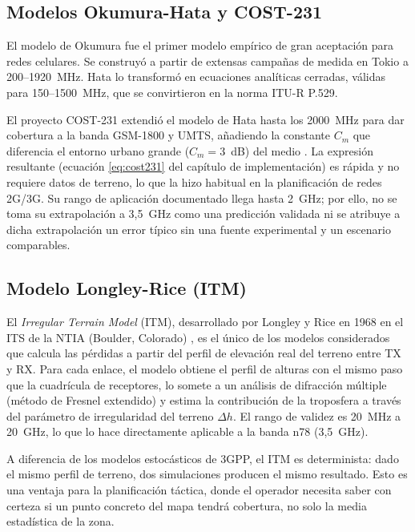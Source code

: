\subsection{Modelos Okumura-Hata y COST-231}
\label{subsec:hata}

El modelo de Okumura \cite{okumura1968field} fue el primer modelo empírico de gran
aceptación para redes celulares. Se construyó a partir de extensas campañas de medida en
Tokio a 200--1920~MHz. Hata \cite{hata1980empirical} lo transformó en ecuaciones analíticas
cerradas, válidas para 150--1500~MHz, que se convirtieron en la norma ITU-R P.529.

El proyecto COST-231 extendió el modelo de Hata hasta los 2000~MHz para dar cobertura a
la banda GSM-1800 y UMTS, añadiendo la constante $C_m$ que diferencia el entorno urbano
grande ($C_m = 3$~dB) del medio \cite{cost231finalreport1999}. La expresión resultante
(ecuación \ref{eq:cost231} del capítulo de implementación) es rápida y no requiere datos
de terreno, lo que la hizo habitual en la planificación de redes 2G/3G. Su rango de
aplicación documentado llega hasta 2~GHz; por ello, no se toma su extrapolación a 3,5~GHz
como una predicción validada ni se atribuye a dicha extrapolación un error típico sin una
fuente experimental y un escenario comparables.

\subsection{Modelo Longley-Rice (ITM)}
\label{subsec:longleyrice}

El \textit{Irregular Terrain Model} (ITM), desarrollado por Longley y Rice en 1968 en
el ITS de la NTIA (Boulder, Colorado) \cite{longley1968transmission}, es el único de los
modelos considerados que calcula las pérdidas a partir del perfil de elevación real del
terreno entre TX y RX. Para cada enlace, el modelo obtiene el perfil de alturas con el
mismo paso que la cuadrícula de receptores, lo somete a un análisis de difracción múltiple
(método de Fresnel extendido) y estima la contribución de la troposfera a través del
parámetro de irregularidad del terreno $\Delta h$. El rango de validez es 20~MHz a
20~GHz, lo que lo hace directamente aplicable a la banda n78 (3,5~GHz).

A diferencia de los modelos estocásticos de 3GPP, el ITM es determinista: dado el mismo
perfil de terreno, dos simulaciones producen el mismo resultado. Esto es una ventaja para
la planificación táctica, donde el operador necesita saber con certeza si un punto concreto
del mapa tendrá cobertura, no solo la media estadística de la zona.


